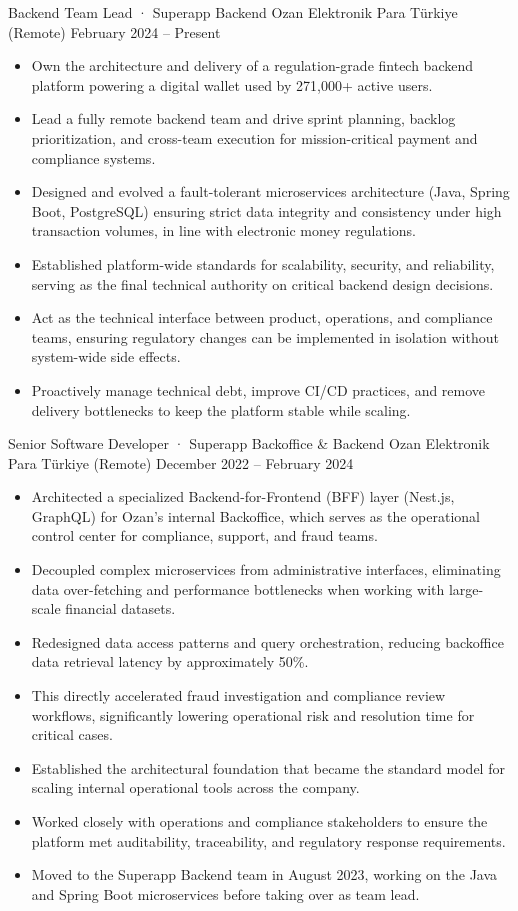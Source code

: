 \resumeSubheading
  {Backend Team Lead · Superapp Backend}
  {Ozan Elektronik Para}
  {Türkiye (Remote)}
  {February 2024 -- Present}
\begin{itemize}
  \item Own the architecture and delivery of a regulation-grade fintech backend platform powering a digital wallet used by 271,000+ active users.
  \item Lead a fully remote backend team and drive sprint planning, backlog prioritization, and cross-team execution for mission-critical payment and compliance systems.
  \item Designed and evolved a fault-tolerant microservices architecture (Java, Spring Boot, PostgreSQL) ensuring strict data integrity and consistency under high transaction volumes, in line with electronic money regulations.
  \item Established platform-wide standards for scalability, security, and reliability, serving as the final technical authority on critical backend design decisions.
  \item Act as the technical interface between product, operations, and compliance teams, ensuring regulatory changes can be implemented in isolation without system-wide side effects.
  \item Proactively manage technical debt, improve CI/CD practices, and remove delivery bottlenecks to keep the platform stable while scaling.
\end{itemize}
\vspace{0.3em}

\resumeSubheading
  {Senior Software Developer · Superapp Backoffice \& Backend}
  {Ozan Elektronik Para}
  {Türkiye (Remote)}
  {December 2022 -- February 2024}
\begin{itemize}
  \item Architected a specialized Backend-for-Frontend (BFF) layer (Nest.js, GraphQL) for Ozan’s internal Backoffice, which serves as the operational control center for compliance, support, and fraud teams.
  \item Decoupled complex microservices from administrative interfaces, eliminating data over-fetching and performance bottlenecks when working with large-scale financial datasets.
  \item Redesigned data access patterns and query orchestration, reducing backoffice data retrieval latency by approximately 50\%.
  \item This directly accelerated fraud investigation and compliance review workflows, significantly lowering operational risk and resolution time for critical cases.
  \item Established the architectural foundation that became the standard model for scaling internal operational tools across the company.
  \item Worked closely with operations and compliance stakeholders to ensure the platform met auditability, traceability, and regulatory response requirements.
  \item Moved to the Superapp Backend team in August 2023, working on the Java and Spring Boot microservices before taking over as team lead.
\end{itemize}
\vspace{0.3em}


